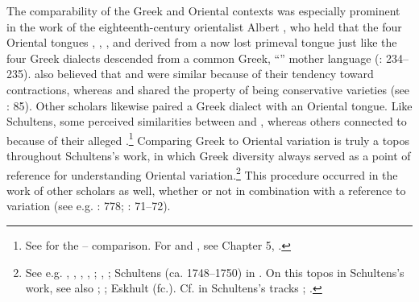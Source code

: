 The comparability of the Greek and Oriental contexts was especially prominent in the work of the eighteenth-century  orientalist Albert \citeauthor{Schultens1739}, who held that the four Oriental tongues , , , and  derived from a now lost primeval tongue just like the four Greek dialects descended from a common Greek, “” mother language (\citeyear{Schultens1739}: 234–235). \citet[\textsc{xcvi}]{Schultens1748} also believed that  and  were similar because of their tendency toward contractions, whereas  and  shared the property of being conservative varieties (see \citealt{Eskhult2015}: 85). Other scholars likewise paired a Greek dialect with an Oriental tongue. Like Schultens, some perceived similarities between  and , whereas others connected  to  because of their alleged .\footnote{See \citet[425--432]{Lakemacher1730} for the – comparison. For  and  , see Chapter 5, .} Comparing Greek to Oriental variation is truly a topos throughout Schultens’s work, in which Greek diversity always served as a point of reference for understanding Oriental variation.\footnote{See e.g. \citet[490]{Schultens1769}, \citet[4]{Schultens1732}, \citet[5]{Schultens1737}, \citet[19--21]{Schultens1738a}, \citet[106--107, stressing that the Oriental and the  contexts were less comparable]{Schultens1738b}; \citet[187]{Schultens1739}, \citet[\textsc{xcvi}]{Schultens1748}; Schultens (ca. 1748–1750) in \citet[§\textsc{xxvii}]{Eskhult_albert_nodate}. On this topos in Schultens’s work, see also \citet[105]{Fuck1955}; \citet[707]{Covington1979}; Eskhult (fc.). Cf. in Schultens’s tracks \citet[5]{Polier1739}; \citet{Groddeck1747}.} This procedure occurred in the work of other scholars as well, whether or not in combination with a reference to  variation (see e.g. \citealt{Bochart1646}: 778; \citealt{Blount1680}: 71–72).

